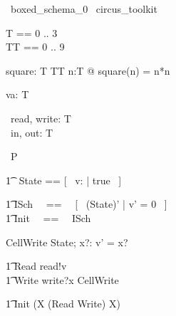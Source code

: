 \begin{zsection}
  \SECTION\ boxed\_schema\_0 \parents\ circus\_toolkit
\end{zsection}

\begin{zed}
	T == 0 .. 3 \\
	TT == 0 .. 9 \\
\end{zed}

\begin{axdef}
    square: T \fun TT 
\where
    \forall n:T @ square(n) = n*n
\end{axdef}

\begin{axdef}
    va: T 
\end{axdef}

\begin{circus}
	\circchannel\ read, write: T \\
	\circchannel\ in, out: T \\
\end{circus}

\begin{circus}
    \circprocess\ P \circdef \circbegin \\
\end{circus}
\begin{circusaction}
        \t1 \circstate\ State == [~ v: \nat | true ~] \\
\end{circusaction}
\begin{circusaction}
        \t1 ISch ~~==~~ [~ (State)' | v' = 0 ~] \\
        \t1 Init ~~==~~ ISch \\
\end{circusaction}
        \begin{schema}{CellWrite}
            \Delta State; x?: \nat 
            \where
            v' = x? 
        \end{schema}
\begin{circusaction}
        \t1 Read \circdef read!v \then \Skip \\
        \t1 Write \circdef write?x \then \lschexpract CellWrite \rschexpract \\
\end{circusaction}
\begin{circusaction}
        \t1 \circspot \lschexpract Init \rschexpract \circseq (\circmu X \circspot (Read \extchoice Write) \circseq X) \\ 
\end{circusaction}
\begin{circus}
	\circend
\end{circus}
